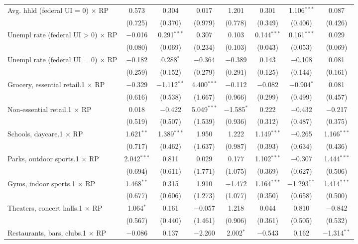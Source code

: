 \begin{table}[!htbp]
\begin{tabular}{@{\extracolsep{5pt}}lccccccc}
  Avg. hhld  (federal UI = 0) $\times$ RP & 0.573 & 0.304 & 0.017 & 1.201 & 0.301 & 1.106$^{***}$ & 0.087 \\ 
  & (0.725) & (0.370) & (0.979) & (0.778) & (0.349) & (0.406) & (0.426) \\ 
  Unempl rate (federal UI > 0) $\times$ RP & $-$0.016 & 0.291$^{***}$ & 0.307 & 0.103 & 0.144$^{***}$ & 0.161$^{***}$ & 0.029 \\ 
  & (0.080) & (0.069) & (0.234) & (0.103) & (0.043) & (0.053) & (0.069) \\ 
  Unempl rate (federal UI = 0) $\times$ RP & $-$0.182 & 0.288$^{*}$ & $-$0.364 & $-$0.389 & 0.143 & $-$0.108 & 0.081 \\ 
  & (0.259) & (0.152) & (0.279) & (0.291) & (0.125) & (0.144) & (0.161) \\ 
  Grocery, essential retail.1 $\times$ RP & $-$0.329 & $-$1.112$^{**}$ & 4.400$^{***}$ & $-$0.112 & $-$0.082 & $-$0.904$^{*}$ & 0.081 \\ 
  & (0.616) & (0.538) & (1.667) & (0.966) & (0.299) & (0.499) & (0.457) \\ 
  Non-essential retail.1 $\times$ RP & 0.018 & $-$0.422 & 5.049$^{***}$ & $-$1.585$^{*}$ & 0.222 & $-$0.432 & $-$0.217 \\ 
  & (0.519) & (0.507) & (1.539) & (0.936) & (0.312) & (0.487) & (0.375) \\ 
  Schools, daycare.1 $\times$ RP & 1.621$^{**}$ & 1.389$^{***}$ & 1.950 & 1.222 & 1.149$^{***}$ & $-$0.265 & 1.166$^{***}$ \\ 
  & (0.717) & (0.462) & (1.637) & (0.987) & (0.393) & (0.634) & (0.436) \\ 
  Parks, outdoor sports.1 $\times$ RP & 2.042$^{***}$ & 0.811 & 0.029 & 0.177 & 1.102$^{***}$ & $-$0.307 & 1.444$^{***}$ \\ 
  & (0.694) & (0.611) & (1.771) & (1.075) & (0.369) & (0.627) & (0.506) \\ 
  Gyms, indoor sports.1 $\times$ RP & 1.468$^{**}$ & 0.315 & 1.910 & $-$1.472 & 1.164$^{***}$ & $-$1.293$^{**}$ & 1.414$^{***}$ \\ 
  & (0.677) & (0.606) & (1.273) & (1.077) & (0.350) & (0.658) & (0.500) \\ 
  Theaters, concert halls.1 $\times$ RP & 1.064$^{*}$ & 0.161 & $-$0.057 & 1.218 & 0.044 & 0.810 & $-$0.842 \\ 
  & (0.567) & (0.440) & (1.461) & (0.906) & (0.361) & (0.505) & (0.532) \\ 
  Restaurants, bars, clubs.1 $\times$ RP & $-$0.086 & 0.137 & $-$2.260 & 2.002$^{*}$ & $-$0.543 & 0.162 & $-$1.314$^{**}$ \\ 

\end{tabular}
\end{table}
